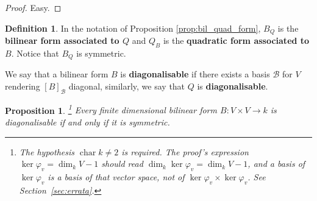 \documentclass[12pt]{article}
\theoremstyle{plain}
\newtheorem{proposition}[thm]{Proposition}
\theoremstyle{definition}
\newtheorem{defn}[thm]{Definition} %
\newcommand{\scr}[1]{\mathscr{#1}}
\newcommand{\lto}{\longrightarrow}
\begin{document}
\begin{proof}
Easy.
\end{proof}
\begin{defn}\label{def:associated_forms}
In the notation of Proposition \ref{prop:bil_quad_form}, $B_Q$ is the \textbf{bilinear form associated to $Q$} and $Q_B$ is the \textbf{quadratic form associated to $B$}. Notice that $B_Q$ is symmetric.

We say that a bilinear form $B$ is \textbf{diagonalisable} if there exists a basis $\scr{B}$ for $V$ rendering $[B]_{\scr{B}}$ diagonal, similarly, we say that $Q$ is \textbf{diagonalisable}.

\end{defn}
\begin{proposition}\label{prop:diagonalisable_symmetric}\footnote{The hypothesis $\operatorname{char}k\neq 2$ is required. The proof's expression $\ker\varphi_v=\dim_k V-1$ should read $\dim_k\ker\varphi_v=\dim_k V-1$, and a basis of $\ker\varphi_v$ is a basis of that vector space, not of $\ker\varphi_v\times\ker\varphi_v$. See Section~\ref{sec:errata}.}
Every finite dimensional bilinear form $B: V \times V \lto k$ is diagonalisable if and only if it is symmetric.
\end{proposition}
\end{document}

